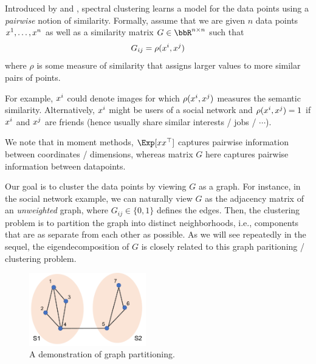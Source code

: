 Introduced by \citet{shi2000normalized} and \citet{ng2001spectral}, spectral clustering learns a model for the data points using a \emph{pairwise} notion of similarity. Formally, assume that we are given $n$ data points $x\sp{1}, \dots, x\sp{n}$ as well as a similarity matrix $G \in \bbR^{n\times n}$ such that 
\begin{equation}
    G_{ij} = \rho (x\sp{i}, x\sp{j})
\end{equation}
where $\rho$ is some measure of similarity that assigns larger values to more similar pairs of points. 

For example, $x\sp{i}$ could denote images for which $\rho (x\sp{i}, x\sp{j})$ measures the semantic similarity. Alternatively, $x\sp{i}$ might be users of a social network and $\rho (x\sp{i}, x\sp{j}) = 1$ if $x\sp{i}$ and $x\sp{j}$ are friends (hence usually share similar interests / jobs / $\cdots$). 

We note that in moment methods, $\Exp[xx^\top]$ captures pairwise information between coordinates / dimensions, whereas matrix $G$ here captures pairwise information between datapoints.

Our goal is to cluster the data points by viewing $G$ as a graph. For instance, in the social network example, we can naturally view $G$ as the adjacency matrix of an \emph{unweighted} graph, where $G_{ij} \in \{0, 1\}$ defines the edges. Then, the clustering problem is to partition the graph into distinct neighborhoods, i.e., components that are as separate from each other as possible. As we will see repeatedly in the sequel, the eigendecomposition of $G$ is closely related to this graph paritioning / clustering problem.

\begin{figure}[ht]
	\centering
	\includegraphics[width=2in]{figures/ssl1.pdf}
	\caption{A demonstration of graph partitioning.}
\end{figure}


